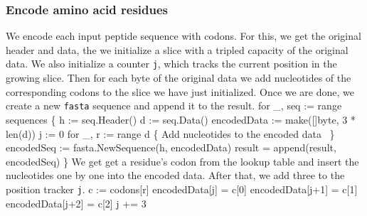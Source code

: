 \subsubsection{Encode amino acid residues}
We encode each input peptide sequence with codons. For this, we get
the original header and data, the we initialize a slice with a tripled
capacity of the original data. We also initialize a counter
\texttt{j}, which tracks the current position in the growing
slice. Then for each byte of the original data we add nucleotides of
the corresponding codons to the slice we have just initialized. Once
we are done, we create a new \texttt{fasta} sequence and append it to
the result.
\nwenddocs{}\endmoddef\nwstartdeflinemarkup{}\nwenddeflinemarkup
for _, seq := range sequences \{
          h := seq.Header()
          d := seq.Data()
          encodedData := make([]byte, 3 * len(d))
          j := 0
          for _, r := range d \{
                  \LA{}Add nucleotides to the encoded data~{\nwtagstyle{}}\RA{}
          \}
          encodedSeq := fasta.NewSequence(h, encodedData)
          result = append(result, encodedSeq)
\}
\nwendcode{}\nwdocspar
We get get a residue's codon from the lookup table and insert the
nucleotides one by one into the encoded data. After that, we add three
to the position tracker \texttt{j}.
\nwenddocs{}\endmoddef\nwstartdeflinemarkup{}\nwenddeflinemarkup
c := codons[r]
encodedData[j] = c[0]
encodedData[j+1] = c[1]
encodedData[j+2] = c[2]
j += 3
\nwendcode{}\nwdocspar
